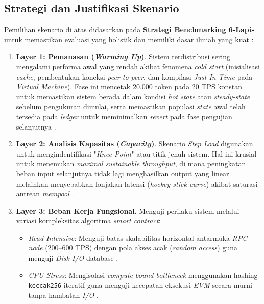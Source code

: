 \subsection{Strategi dan Justifikasi Skenario}
Pemilihan skenario di atas didasarkan pada \textbf{Strategi Benchmarking 6-Lapis} untuk memastikan evaluasi yang holistik dan memiliki dasar ilmiah yang kuat \cite{spec2019}:

\begin{enumerate}
    \item \textbf{Layer 1: Pemanasan (\textit{Warming Up})}.
    Sistem terdistribusi sering mengalami performa awal yang rendah akibat fenomena \textit{cold start} (inisialisasi \textit{cache}, pembentukan koneksi \textit{peer-to-peer}, dan kompilasi \textit{Just-In-Time} pada \textit{Virtual Machine}). Fase ini mencetak 20.000 token pada 20 TPS konstan untuk memastikan sistem berada dalam kondisi \textit{hot state} atau \textit{steady-state} sebelum pengukuran dimulai, serta memastikan populasi \textit{state} awal telah tersedia pada \textit{ledger} untuk meminimalkan \textit{revert} pada fase pengujian selanjutnya \cite{ioini2020, spec2019}.

    \item \textbf{Layer 2: Analisis Kapasitas (\textit{Capacity})}.
    Skenario \textit{Step Load} digunakan untuk mengindentifikasi "\textit{Knee Point}" atau titik jenuh sistem. Hal ini krusial untuk menemukan \textit{maximal sustainable throughput}, di mana peningkatan beban input selanjutnya tidak lagi menghasilkan output yang linear melainkan menyebabkan lonjakan latensi (\textit{hockey-stick curve}) akibat saturasi antrean \textit{mempool} \cite{thakkar2018, spillner2019}.

    \item \textbf{Layer 3: Beban Kerja Fungsional}.
    Menguji perilaku sistem melalui variasi kompleksitas algoritma \textit{smart contract}:
    \begin{itemize}
        \item \textit{Read-Intensive}: Menguji batas skalabilitas horizontal antarmuka \textit{RPC node} (200--600 TPS) dengan pola akses acak (\textit{random access}) guna menguji \textit{Disk I/O} database \cite{pongnumkul2017}.
        \item \textit{CPU Stress}: Mengisolasi \textit{compute-bound bottleneck} menggunakan hashing \texttt{keccak256} iteratif guna menguji kecepatan eksekusi \textit{EVM} secara murni tanpa hambatan \textit{I/O} \cite{dinh2017}.
    \end{itemize}


\end{enumerate}
